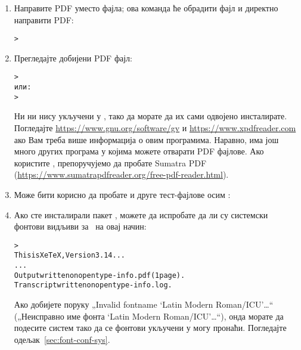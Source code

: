 \documentclass{article}
\begin{document}
\begin{enumerate}
\item Направите PDF уместо \dvi{} фајла; ова команда ће
  обрадити  фајл и директно направити PDF:
\begin{alltt}> 
\end{alltt}

\item Прегледајте добијени PDF фајл:
\begin{alltt}> 
\textrm{или:}
> 
\end{alltt}
Ни  ни  нису укључени у \TL{}, тако да
морате да их сами одвојено инсталирате. Погледајте
\url{https://www.gnu.org/software/gv} и
\url{https://www.xpdfreader.com} ако Вам треба више информација о
овим програмима. Наравно, има још много других програма у којима
можете отварати PDF фајлове. Ако користите \Windows{},
препоручујемо да пробате Sumatra PDF
(\url{https://www.sumatrapdfreader.org/free-pdf-reader.html}).

\item Може бити корисно да пробате и друге тест-фајлове осим
:


\item Ако сте инсталирали пакет , можете да испробате
  да ли су системски фонтови видљиви за \XeTeX\ на овај начин:
\begin{alltt}> 
This is XeTeX, Version 3.14...
...
Output written on opentype-info.pdf (1 page).
Transcript written on opentype-info.log.
\end{alltt}

Ако добијете поруку „Invalid fontname `Latin Modern Roman/ICU'\dots“
(„Неисправно име фонта `Latin Modern Roman/ICU'\dots“), онда морате
да подесите систем тако да се фонтови укључени у \TL могу пронаћи.
Погледајте одељак~\ref{sec:font-conf-sys}.

\end{enumerate}
\end{document}
